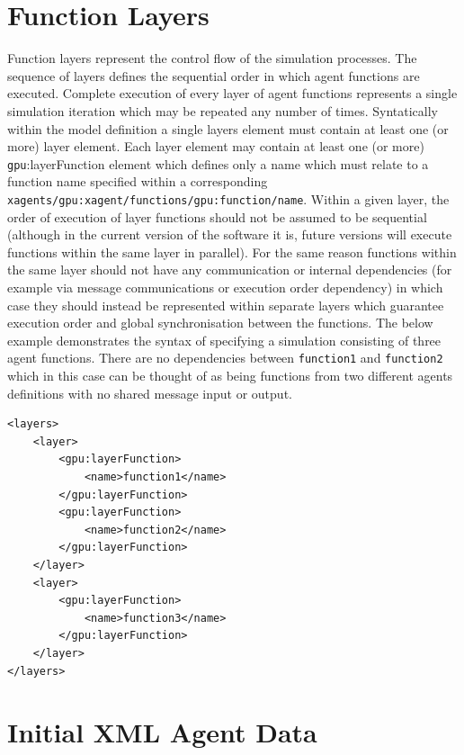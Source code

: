 \documentclass[11pt, a4paper, onecolumn, oneside]{report}
\begin{document}
\section{Function Layers}
\label{sec:26}

Function layers represent the control flow of the simulation processes.
The sequence of layers defines the sequential order in which agent functions are executed.
Complete execution of every layer of agent functions represents a single simulation iteration which may be repeated any number of times.
Syntatically within the model definition a single layers element must contain at least one (or more) layer element.
Each layer element may contain at least one (or more) \texttt{gpu}:layerFunction element which defines only a name which must relate to a function name specified within a corresponding \texttt{xagents/gpu:xagent/functions/gpu:function/name}.
Within a given layer, the order of execution of layer functions should not be assumed to be sequential (although in the current version of the software it is, future versions will execute functions within the same layer in parallel).
For the same reason functions within the same layer should not have any communication or internal dependencies (for example via message communications or execution order dependency) in which case they should instead be represented within separate layers which guarantee execution order and global synchronisation between the functions.
The below example demonstrates the syntax of specifying a simulation consisting of three agent functions.
There are no dependencies between \texttt{function1} and \texttt{function2} which in this case can be thought of as being functions from two different agents definitions with no shared message input or output.


\begin{verbatim}
<layers>
    <layer>
        <gpu:layerFunction>
            <name>function1</name>
        </gpu:layerFunction>
        <gpu:layerFunction>
            <name>function2</name>
        </gpu:layerFunction>
    </layer>
    <layer>
        <gpu:layerFunction>
            <name>function3</name>
        </gpu:layerFunction>
    </layer>
</layers>
\end{verbatim}


\section{Initial XML Agent Data}
\label{sec:27}
\end{document}
